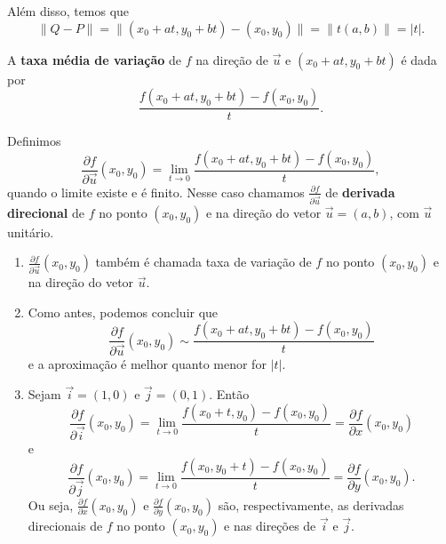 Além disso, temos que \[\|Q - P\| = \| (x_0 + at, y_0 + bt) - (x_0,y_0) \| = \|t(a,b)\| = |t|.\]

\begin{definition}
    A \textbf{taxa média de variação} de \(f\) na direção de \(\overrightarrow{u}\) e \((x_0+at,y_0+bt)\) é dada por \[\frac{f(x_0+at,y_0+bt) - f(x_0,y_0)}{t}.\]
\end{definition}

\begin{definition}
    Definimos \[\frac{\partial f}{\partial \overrightarrow{u}}(x_0,y_0) = \lim_{t\to 0} \frac{f(x_0+at,y_0+bt) - f(x_0,y_0)}{t},\] quando o limite existe e é finito. Nesse caso chamamos \(\frac{\partial f}{\partial \overrightarrow{u}}\) de \textbf{derivada direcional}  de \(f\) no ponto \((x_0,y_0)\) e na direção do vetor \(\overrightarrow{u} = (a,b)\), com \(\overrightarrow{u}\) unitário.
\end{definition}

\begin{remark}
    \begin{enumerate}
        \item \(\frac{\partial f}{\partial \overrightarrow{u}}(x_0,y_0)\) também é chamada taxa de variação de \(f\) no ponto \((x_0,y_0)\) e na direção do vetor \(\overrightarrow{u}\).
        \item Como antes, podemos concluir que \[\frac{\partial f}{\partial \overrightarrow{u}}(x_0,y_0) \sim \frac{f(x_0+at,y_0+bt) - f(x_0,y_0)}{t}\] e a aproximação é melhor quanto menor for \(|t|\).
        \item Sejam \(\overrightarrow{i} = (1,0)\) e \(\overrightarrow{j} = (0,1)\). Então \[\frac{\partial f}{\partial \overrightarrow{i}}(x_0,y_0) = \lim_{t\to 0} \frac{f(x_0 + t,y_0) - f(x_0,y_0)}{t} = \frac{\partial f}{\partial x}(x_0,y_0)\] e \[\frac{\partial f}{\partial \overrightarrow{j}}(x_0,y_0) = \lim_{t\to 0} \frac{f(x_0,y_0+t) - f(x_0,y_0)}{t} = \frac{\partial f}{\partial y}(x_0,y_0). \] Ou seja, \(\frac{\partial f}{\partial x}(x_0,y_0)\) e \(\frac{\partial f}{\partial y}(x_0,y_0)\) são, respectivamente, as derivadas direcionais de \(f\) no ponto \((x_0,y_0)\) e nas direções de \(\overrightarrow{i}\) e \(\overrightarrow{j}\).
    \end{enumerate}
\end{remark}

